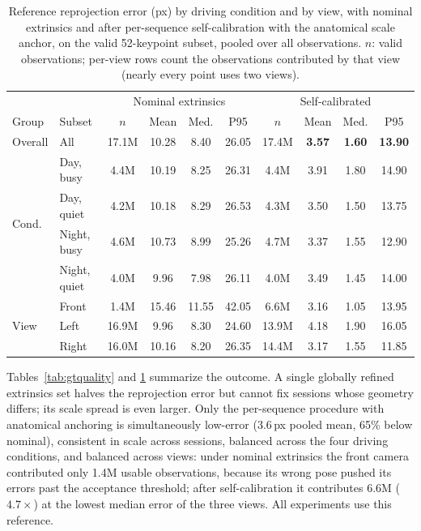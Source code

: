 \documentclass[journal]{IEEEtran}
\newcommand{\best}[1]{\textbf{#1}}
\begin{document}
\begin{table}[t]
\centering
\caption{Reference reprojection error (px) by driving condition and by view, with nominal extrinsics and after per-sequence self-calibration with the anatomical scale anchor, on the valid 52-keypoint subset, pooled over all observations. $n$: valid observations; per-view rows count the observations contributed by that view (nearly every point uses two views).}
\label{tab:gtbreak}
\scriptsize
\setlength{\tabcolsep}{2.6pt}
\begin{tabular}{llcccc|cccc}
\toprule
& & \multicolumn{4}{c|}{Nominal extrinsics} & \multicolumn{4}{c}{Self-calibrated} \\
Group & Subset & $n$ & Mean & Med. & P95 & $n$ & Mean & Med. & P95 \\
\midrule
Overall & All & 17.1M & 10.28 & 8.40 & 26.05 & 17.4M & \best{3.57} & \best{1.60} & \best{13.90} \\
\midrule
\multirow{4}{*}{Cond.} & Day, busy & 4.4M & 10.19 & 8.25 & 26.31 & 4.4M & 3.91 & 1.80 & 14.90 \\
 & Day, quiet & 4.2M & 10.18 & 8.29 & 26.53 & 4.3M & 3.50 & 1.50 & 13.75 \\
 & Night, busy & 4.6M & 10.73 & 8.99 & 25.26 & 4.7M & 3.37 & 1.55 & 12.90 \\
 & Night, quiet & 4.0M & 9.96 & 7.98 & 26.11 & 4.0M & 3.49 & 1.45 & 14.00 \\
\midrule
\multirow{3}{*}{View} & Front & 1.4M & 15.46 & 11.55 & 42.05 & 6.6M & 3.16 & 1.05 & 13.95 \\
 & Left & 16.9M & 9.96 & 8.30 & 24.60 & 13.9M & 4.18 & 1.90 & 16.05 \\
 & Right & 16.0M & 10.16 & 8.20 & 26.35 & 14.4M & 3.17 & 1.55 & 11.85 \\
\bottomrule
\end{tabular}
\end{table}

Tables~\ref{tab:gtquality} and \ref{tab:gtbreak} summarize the outcome. A single globally refined extrinsics set halves the reprojection error but cannot fix sessions whose geometry differs; its scale spread is even larger. Only the per-sequence procedure with anatomical anchoring is simultaneously low-error (3.6\,px pooled mean, 65\% below nominal), consistent in scale across sessions, balanced across the four driving conditions, and balanced across views: under nominal extrinsics the front camera contributed only 1.4M usable observations, because its wrong pose pushed its errors past the acceptance threshold; after self-calibration it contributes 6.6M ($4.7\times$) at the lowest median error of the three views. All experiments use this reference.
\end{document}
